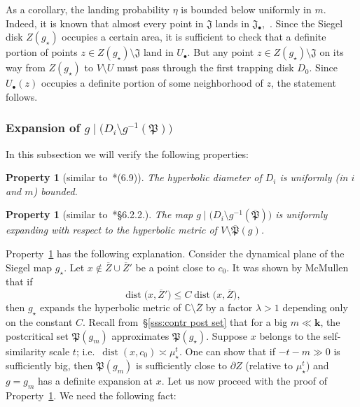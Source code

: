 \documentclass{amsart}
\newcommand{\1}{{\mathbb 1 }}
\newcommand\Jul{{\mathfrak J}}
\newcommand\Post{{\mathfrak P}}
\newcommand\ovPost{{\overline{\mathfrak P}}}
\newcommand{\bbk}{{\mathbf k}}
\newcommand{\str}{{\star}}
\newcommand{\C}{\mathbb{C}}
\newtheorem{property}[thm]{Property}
\theoremstyle{remark}
\numberwithin{equation}{section}
\theoremstyle{definition}
\newcommand{\dist}{\operatorname{dist}}
\theoremstyle{nonumberbreak}
\begin{document}
As a corollary, the landing probability $\eta$ is bounded below uniformly in $m$.
Indeed, it is known that almost every point in $\Jul$ lands in $\Jul_\bullet$,~\cite{L:TypBeh}. Since the Siegel disk $Z(g_\str)$ occupies a certain area, it is sufficient to check that a definite portion of points $z \in Z (g_\str)\setminus \Jul$ land
in $U_\bullet$. But any point $z \in Z (g_\str)\setminus \Jul$ on its way from $Z(g_\str)$ to $V\setminus U$ must pass through the
first trapping disk $D_0$. Since $U_\bullet(z)$ occupies a definite portion of some neighborhood of $z$, the statement follows.


\subsubsection{Expansion of $g\mid\big( D_i\setminus g^{-1}(\Post)\big)$}
In this subsection we will verify the following properties:
\begin{property}[similar to~\cite{AL-posmeas}*{(6.9)}]
\label{prop:trap disk:hyp diam is bound}
The hyperbolic diameter of $D_i$ is uniformly (in $i$ and $m$) bounded.
\end{property}

\begin{property}[similar to~\cite{AL-posmeas}*{\S 6.2.2.}]
\label{property:g D_i is exp}
The map $g\mid \big(D_i\setminus g^{-1}(\ovPost)\big)$ is uniformly expanding with respect to the hyperbolic metric of $V\setminus \ovPost(g)$. 
\end{property}


Property~\ref{property:g D_i is exp} has the following explanation.  Consider the dynamical plane of the Siegel map $g_\str$. Let $x\not\in \overline Z \cup \overline Z'$ be a point close to $c_0$. It was shown by McMullen~\cite{McM3} that if \[\dist \big(x, \overline Z'\big)\le C \dist\big(x,\overline Z\big),\] then $g_\str$ expands the hyperbolic metric of $\C\setminus \overline Z$ by a factor $\lambda>1$ depending only on the constant $C$. Recall from~\S\ref{sss:contr post set} that for a big $m\ll \bbk$, the postcritical set $\Post(g_m)$ approximates $\Post(g_\str)$. Suppose $x$ belongs to the self-similarity scale $t$; i.e.~$\dist(x, c_0)\asymp \mu_\str^t$. One can show that if $-t-m\gg 0$ is sufficiently big, then $\Post(g_m)$ is sufficiently close to $\partial Z$ (relative to $ \mu_\str^t$) and $g=g_m$ has a definite expansion at $x$.  Let us now proceed with the proof of Property~\ref{property:g D_i is exp}. We need the following fact:
\end{document}

